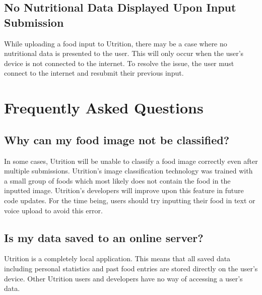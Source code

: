\documentclass{article}
\begin{document}
\subsection{No Nutritional Data Displayed Upon Input Submission}
While uploading a food input to Utrition, there may be a case where no nutritional data is presented to the user. This will only occur when the user's device is not connected to the internet. To resolve the issue, the user must connect to the internet and resubmit their previous input. 

\section{Frequently Asked Questions}
\subsection{Why can my food image not be classified?}
In some cases, Utrition will be unable to classify a food image correctly even after multiple submissions. Utrition's image classification technology was trained with a small group of foods which most likely does not contain the food in the inputted image. Utrition's developers will improve upon this feature in future code updates. For the time being, users should try inputting their food in text or voice upload to avoid this error.
\subsection{Is my data saved to an online server?}
Utrition is a completely local application. This means that all saved data including personal statistics and past food entries are stored directly on the user's device. Other Utrition users and developers have no way of accessing a user's data.
\end{document}
